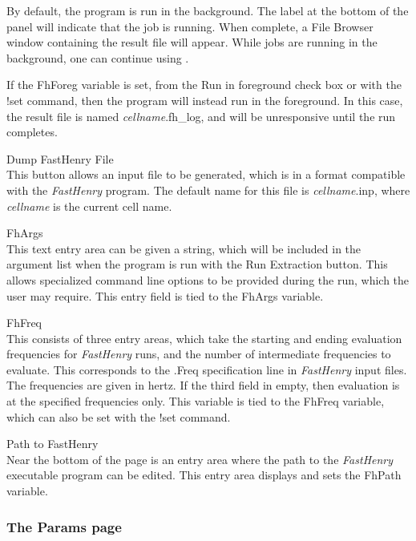 \begin{description}
By default, the program is run in the background.  The label at the
bottom of the panel will indicate that the job is running.  When
complete, a {\cb File Browser} window containing the result file will
appear.  While jobs are running in the background, one can continue
using {\Xic}.

If the {\et FhForeg} variable is set, from the {\cb Run in foreground}
check box or with the {\cb !set} command, then the program will
instead run in the foreground.  In this case, the result file is named
{\it cellname\/}{\vt .fh\_log}, and {\Xic} will be unresponsive until
the run completes.

\item{\cb Dump FastHenry File}\\
This button allows an input file to be generated, which is in a format
compatible with the {\it FastHenry} program.  The default name for
this file is {\it cellname\/}{\vt .inp}, where {\it cellname} is the
current cell name.

\item{\cb FhArgs}\\
This text entry area can be given a string, which will be included in
the argument list when the program is run with the {\cb Run
Extraction} button.  This allows specialized command line options to
be provided during the run, which the user may require.  This entry
field is tied to the {\et FhArgs} variable.

\item{\cb FhFreq}\\
This consists of three entry areas, which take the starting and ending
evaluation frequencies for {\it FastHenry} runs, and the number of
intermediate frequencies to evaluate.  This corresponds to the {\vt
.Freq} specification line in {\it FastHenry} input files.  The
frequencies are given in hertz.  If the third field in empty, then
evaluation is at the specified frequencies only.  This variable is
tied to the {\et FhFreq} variable, which can also be set with the {\cb
!set} command.

\item{\cb Path to FastHenry}\\
Near the bottom of the page is an entry area where the path to the
{\it FastHenry} executable program can be edited.  This entry area
displays and sets the {\et FhPath} variable.
\end{description}

\subsubsection{The Params page}

